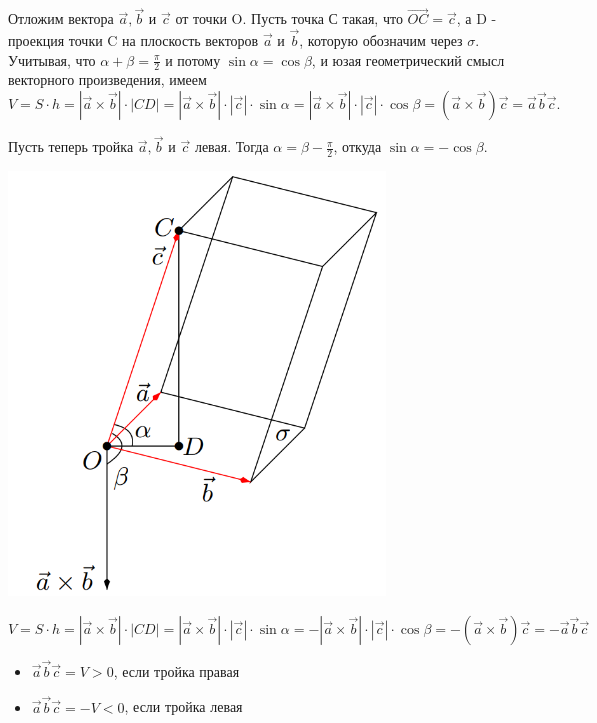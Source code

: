\documentclass[a4paper]{article}
\begin{document}
Отложим вектора $\vec{a}, \vec{b}$ и $\vec{c}$ от точки O. Пусть точка С такая, что $\overrightarrow{OC} = \vec{c}$, а D - проекция точки C на плоскость векторов $\vec{a}$ и $\vec{b}$, которую обозначим через $\sigma$. Учитывая, что $\alpha + \beta = \frac{\pi}{2}$ и потому $\sin \alpha = \cos \beta$, и юзая геометрический смысл векторного произведения, имеем 
\begin{equation}
V = S \cdot h =  | \vec{a} \times \vec{b} | \cdot | CD | = |\vec{a} \times \vec{b}| \cdot | \vec{c} | \cdot \sin \alpha = |\vec{a} \times \vec{b}| \cdot | \vec{c} | \cdot \cos \beta = ( \vec{a} \times \vec{b}) \vec{c} = \vec{a} \vec{b} \vec{c}.
\end{equation}

Пусть теперь тройка $\vec{a}, \vec{b}$ и $\vec{c}$ левая. Тогда $\alpha = \beta - \frac{\pi}{2}$, откуда $\sin \alpha = - \cos \beta$.

\includegraphics[width=10cm]{t5}

\begin{equation}
V = S \cdot h = | \vec{a} \times \vec{b} | \cdot | CD | = | \vec{a} \times \vec{b} | \cdot | \vec{c} | \cdot \sin \alpha = - | \vec{a} \times \vec{b} | \cdot | \vec{c} | \cdot \cos \beta = - (\vec{a} \times \vec{b}) \vec{c} = -\vec{a} \vec{b} \vec{c}
\end{equation}

\begin{itemize}
\item $\vec{a} \vec{b} \vec{c} = V > 0$, если тройка правая
\item $\vec{a} \vec{b} \vec{c} = -V < 0$, если тройка левая
\end{itemize}
\end{document}

